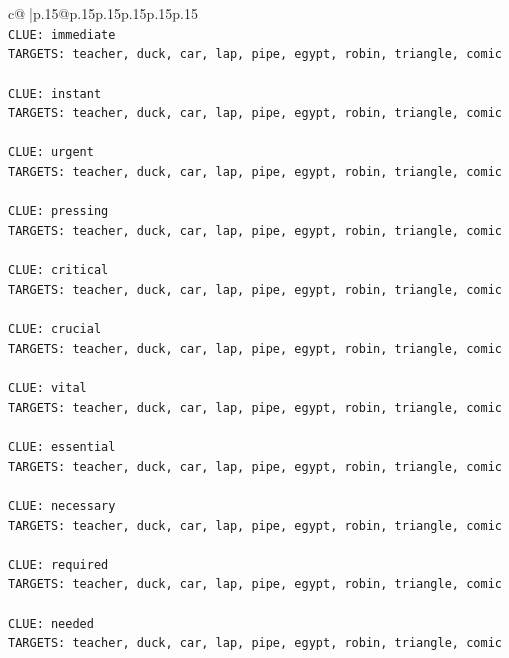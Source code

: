 \documentclass{article}
\begin{document}
{\begin{supertabular}{c@{$\;$}|p{.15\linewidth}@{}p{.15\linewidth}p{.15\linewidth}p{.15\linewidth}p{.15\linewidth}p{.15\linewidth}}
{{{\\ 
\texttt{CLUE: immediate} \\
\texttt{TARGETS: teacher, duck, car, lap, pipe, egypt, robin, triangle, comic} \\
\\ 
\texttt{CLUE: instant} \\
\texttt{TARGETS: teacher, duck, car, lap, pipe, egypt, robin, triangle, comic} \\
\\ 
\texttt{CLUE: urgent} \\
\texttt{TARGETS: teacher, duck, car, lap, pipe, egypt, robin, triangle, comic} \\
\\ 
\texttt{CLUE: pressing} \\
\texttt{TARGETS: teacher, duck, car, lap, pipe, egypt, robin, triangle, comic} \\
\\ 
\texttt{CLUE: critical} \\
\texttt{TARGETS: teacher, duck, car, lap, pipe, egypt, robin, triangle, comic} \\
\\ 
\texttt{CLUE: crucial} \\
\texttt{TARGETS: teacher, duck, car, lap, pipe, egypt, robin, triangle, comic} \\
\\ 
\texttt{CLUE: vital} \\
\texttt{TARGETS: teacher, duck, car, lap, pipe, egypt, robin, triangle, comic} \\
\\ 
\texttt{CLUE: essential} \\
\texttt{TARGETS: teacher, duck, car, lap, pipe, egypt, robin, triangle, comic} \\
\\ 
\texttt{CLUE: necessary} \\
\texttt{TARGETS: teacher, duck, car, lap, pipe, egypt, robin, triangle, comic} \\
\\ 
\texttt{CLUE: required} \\
\texttt{TARGETS: teacher, duck, car, lap, pipe, egypt, robin, triangle, comic} \\
\\ 
\texttt{CLUE: needed} \\
\texttt{TARGETS: teacher, duck, car, lap, pipe, egypt, robin, triangle, comic} \\
\\ 
}}}
\end{supertabular}}
\end{document}
